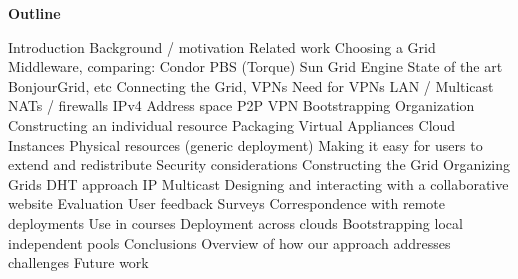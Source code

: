 \documentclass[workingdraft,endnotes]{usetex-v1}
\begin{document}

\small{

\suppressfloats
}

\vspace{5 mm}\large{\bf Outline}
\normalsize{
\begin{outline}
  \1 Introduction
    \2 Background / motivation
    \2 Related work
  \1 Choosing a Grid Middleware, comparing:
    \2 Condor
    \2 PBS (Torque)
    \2 Sun Grid Engine
    \2 State of the art BonjourGrid, etc
  \1 Connecting the Grid, VPNs
    \2 Need for VPNs
      \3 LAN / Multicast
      \3 NATs / firewalls
      \3 IPv4 Address space
    \2 P2P VPN 
      \3 Bootstrapping
      \3 Organization
  \1 Constructing an individual resource
    \2 Packaging
      \3 Virtual Appliances
      \3 Cloud Instances
      \3 Physical resources (generic deployment)
    \2 Making it easy for users to extend and redistribute
    \2 Security considerations
  \1 Constructing the Grid
    \2 Organizing Grids
      \3 DHT approach
      \3 IP Multicast
    \2 Designing and interacting with a collaborative website
  \1 Evaluation
    \2 User feedback
      \3 Surveys
      \3 Correspondence with remote deployments
      \3 Use in courses
    \2 Deployment across clouds
    \2 Bootstrapping local independent pools
  \1 Conclusions
    \2 Overview of how our approach addresses challenges
    \2 Future work
\end{outline}
}
\end{document}
